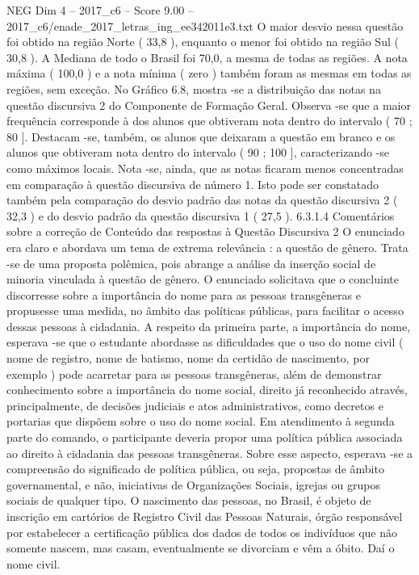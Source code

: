 \begin{textsample}{NEG Dim 4 – 2017\_c6 – Score 9.00 – 2017\_c6/enade\_2017\_letras\_ing\_ee342011e3.txt}
O maior desvio nessa questão foi obtido na região Norte ( 33,8 ), enquanto o menor foi obtido na região Sul ( 30,8 ).
A Mediana de todo o Brasil foi 70,0, a mesma de todas as regiões.
A nota máxima ( 100,0 ) e a nota mínima ( zero ) também foram as mesmas em todas as regiões, sem exceção.
No Gráfico 6.8, mostra -se a distribuição das notas na questão discursiva 2 do Componente de Formação Geral.
Observa -se que a maior frequência corresponde à dos alunos que obtiveram nota dentro do intervalo ( 70 ; 80 ].
Destacam -se, também, os alunos que deixaram a questão em branco e os alunos que obtiveram nota dentro do intervalo ( 90 ; 100 ], caracterizando -se como máximos locais.
Nota -se, ainda, que as notas ficaram menos concentradas em comparação à questão discursiva de número 1.
Isto pode ser constatado também pela comparação do desvio padrão das notas da questão discursiva 2 ( 32,3 ) e do desvio padrão da questão discursiva 1 ( 27,5 ). 6.3.1.4 Comentários sobre a correção de Conteúdo das respostas à Questão Discursiva 2 O enunciado era claro e abordava um tema de extrema relevância : a questão de gênero.
Trata -se de uma proposta polêmica, pois abrange a análise da inserção social de minoria vinculada à questão de gênero.
O enunciado solicitava que o concluinte discorresse sobre a importância do nome para as pessoas transgêneras e propusesse uma medida, no âmbito das políticas públicas, para facilitar o acesso dessas pessoas à cidadania.
A respeito da primeira parte, a importância do nome, esperava -se que o estudante abordasse as dificuldades que o uso do nome civil ( nome de registro, nome de batismo, nome da certidão de nascimento, por exemplo ) pode acarretar para as pessoas transgêneras, além de demonstrar conhecimento sobre a importância do nome social, direito já reconhecido através, principalmente, de decisões judiciais e atos administrativos, como decretos e portarias que dispõem sobre o uso do nome social.
Em atendimento à segunda parte do comando, o participante deveria propor uma política pública associada ao direito à cidadania das pessoas transgêneras.
Sobre esse aspecto, esperava -se a compreensão do significado de política pública, ou seja, propostas de âmbito governamental, e não, iniciativas de Organizações Sociais, igrejas ou grupos sociais de qualquer tipo.
O nascimento das pessoas, no Brasil, é objeto de inscrição em cartórios de Registro Civil das Pessoas Naturais, órgão responsável por estabelecer a certificação pública dos dados de todos os indivíduos que não somente nascem, mas casam, eventualmente se divorciam e vêm a óbito.
Daí o nome civil.

\end{textsample}
